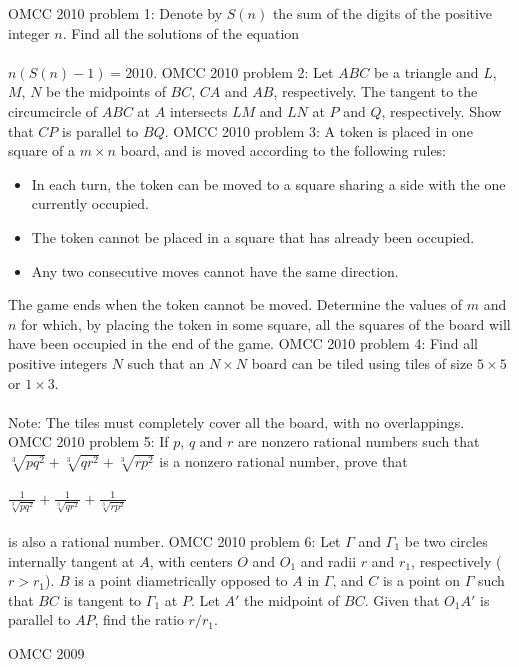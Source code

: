 OMCC 2010 problem 1:  Denote by $S(n)$ the sum of the digits of the positive integer $n$. Find all the solutions of the equation \\\\
$n(S(n)-1)=2010.$ 
OMCC 2010 problem 2:  Let $ABC$ be a triangle and $L$, $M$, $N$ be the midpoints of $BC$, $CA$ and $AB$, respectively. The tangent to the circumcircle of $ABC$ at $A$ intersects $LM$ and $LN$ at $P$ and $Q$, respectively. Show that $CP$ is parallel to $BQ$. 
OMCC 2010 problem 3:  A token is placed in one square of a $m\times n$ board, and is moved according to the following rules:
\begin{itemize}
  \item In each turn, the token can be moved to a square sharing a side with the one currently occupied.

  \item The token cannot be placed in a square that has already been occupied.

  \item Any two consecutive moves cannot have the same direction.
\end{itemize}
The game ends when the token cannot be moved. Determine the values of $m$ and $n$ for which, by placing the token in some square, all the squares of the board will have been occupied in the end of the game. 
OMCC 2010 problem 4:  Find all positive integers $N$ such that an $N\times N$ board can be tiled using tiles of size $5\times 5$ or $1\times 3$. \\\\
Note: The tiles must completely cover all the board, with no overlappings. 
OMCC 2010 problem 5:  If $p$, $q$ and $r$ are nonzero rational numbers such that $\sqrt[3]{pq^2}+\sqrt[3]{qr^2}+\sqrt[3]{rp^2}$ is a nonzero rational number, prove that \\\\
$\frac{1}{\sqrt[3]{pq^2}}+\frac{1}{\sqrt[3]{qr^2}}+\frac{1}{\sqrt[3]{rp^2}}$ \\\\
is also a rational number. 
OMCC 2010 problem 6:  Let $\Gamma$ and $\Gamma_1$ be two circles internally tangent at $A$, with centers $O$ and  $O_1$ and radii $r$ and $r_1$, respectively ($r>r_1$). $B$ is a point diametrically opposed to $A$ in $\Gamma$, and $C$ is a point on $\Gamma$ such that $BC$ is tangent to $\Gamma_1$ at $P$. Let $A'$ the midpoint of $BC$. Given that $O_1A'$ is parallel to $AP$, find the ratio $r/r_1$. 

OMCC 2009 

